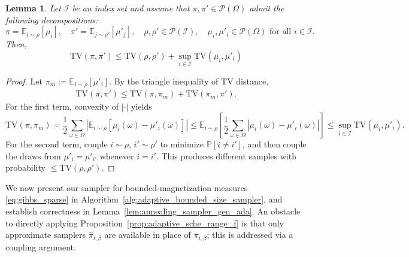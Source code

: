 \documentclass[11pt]{article}
\newtheorem{lemma}{Lemma}
\newcommand{\defeq}{:=}
\newcommand{\1}{\mathbf{1}}
\newcommand{\0}{\mathbf{0}}
\newcommand{\Brack}[1]{\left[#1\right]}
\newcommand{\Abs}[1]{\left|#1\right|}
\newcommand{\TV}[1]{\mathrm{TV}\left(#1\right)}
\newcommand{\Prob}{\mathbb{P}}
\renewcommand{\Pr}{\Prob}
\newcommand{\calI}{{\mathcal{I}}}
\newcommand{\calP}{{\mathcal{P}}}
\newcommand{\bbE}{{\mathbb{E}}}
\begin{document}
\begin{lemma}
\label{lem:tv_bound_mixtures}
Let $\calI$ be an index set and assume that $\pi, \pi' \in \calP(\Omega)$ admit the following decompositions: 
\begin{equation*}
    \pi = \bbE_{i \sim \rho}[\mu_i], \quad \pi' = \bbE_{j\sim \rho'}[\mu'_j], \quad \rho, \rho' \in \calP(\calI),\quad \mu_i, \mu'_i \in \calP(\Omega)\text{ for all } i \in \calI.
\end{equation*}
Then, 
\begin{equation*}
    \TV{\pi, \pi'} \le \TV{\rho, \rho'} + \sup_{i \in \calI}\TV{\mu_i, \mu'_i}
\end{equation*}
\end{lemma}

\begin{proof}
Let $\pi_m \defeq \bbE_{i\sim \rho}[\mu'_i]$.
By the triangle inequality of TV distance, 
\begin{align*}
\TV{\pi, \pi'} \le \TV{\pi, \pi_m} + \TV{\pi_m, \pi'}.
\end{align*}
For the first term, convexity of $|\cdot|$ yields
\[
\TV{\pi, \pi_m} = \frac{1}{2}\sum_{\omega \in \Omega}\Abs{\bbE_{i \sim \rho}[\mu_i(\omega) - \mu'_i(\omega)]} \le \bbE_{i\sim\rho}\Brack{\frac{1}{2}\sum_{\omega \in \Omega}\Abs{\mu_i(\omega) - \mu'_i(\omega)}} \le \sup_{i\in\calI}\TV{\mu_i, \mu'_i}.
\]
For the second term, couple $i \sim \rho$, $i' \sim \rho'$ to minimize $\Pr[i \neq i']$, and then couple the draws from $\mu'_i = \mu'_{i'}$ whenever $i = i'$. This produces different samples with probability $\le \TV{\rho, \rho'}$.
\end{proof}

We now present our sampler for bounded-magnetization measures \eqref{eq:gibbs_sparse} in Algorithm~\ref{alg:adaptive_bounded_size_sampler}, and establish correctness in Lemma~\ref{lem:annealing_sampler_gen_ada}. An obstacle to directly applying Proposition~\ref{prop:adaptive_sche_range_f} is that only approximate samplers $\hat{\pi}_{i,\beta}$ are available in place of $\pi_{i,\beta}$; this is addressed via a coupling argument.
\end{document}
